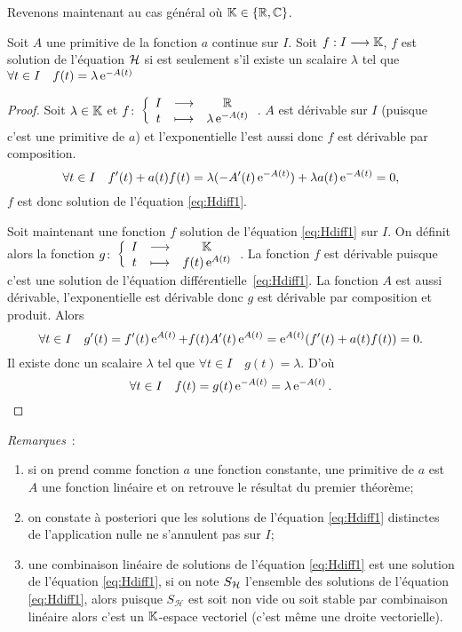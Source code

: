Revenons maintenant au cas général où \(\mathbb{K} \in \{\mathbb{R}, \mathbb{C}\}\).
%
\begin{theo}\label{theo:2}
Soit \(A\) une primitive de la fonction \(a\) continue sur \(I\). Soit \(f:I \longrightarrow \mathbb{K}\), \(f\) est solution de l'équation \(\mathcal{H}\) si est seulement s'il existe un scalaire \(\lambda\) tel que \(\forall t \in I \quad f(t)=\lambda \operatorname{e}^{-A(t)}\)
\end{theo}
\begin{proof}
Soit \(\lambda \in \mathbb{K}\) et \(f\colon \left\{\begin{array}{ccc} I & \longrightarrow &\mathbb{R}\\ t & \longmapsto & \lambda \operatorname{e}^{-A(t)} \end{array} \right.\). \(A\) est dérivable sur \(I\) (puisque c'est une primitive de \(a\)) et l'exponentielle l'est aussi donc \(f\) est dérivable par composition.
\begin{equation}
\forall t \in I \quad f'(t)+a(t)f(t)=\lambda(-A'(t)\operatorname{e}^{-A(t)}) + \lambda a(t)\operatorname{e}^{-A(t)}=0,
\end{equation}
\(f\) est donc solution de l'équation \eqref{eq:Hdiff1}.

Soit maintenant une fonction \(f\) solution de l'équation \eqref{eq:Hdiff1} sur \(I\). On définit alors la fonction \(g\colon \left\{\begin{array}{ccc} I & \longrightarrow &\mathbb{K}\\ t & \longmapsto & f(t)\operatorname{e}^{A(t)} \end{array} \right.\). La fonction \(f\) est dérivable puisque c'est une solution de l'équation différentielle~\eqref{eq:Hdiff1}. La fonction  \(A\) est aussi dérivable, l'exponentielle est dérivable donc \(g\) est dérivable par composition et produit. Alors
\begin{equation}
\forall t \in I \quad g'(t)=f'(t) \operatorname{e}^{A(t)} + f(t)A'(t)\operatorname{e}^{A(t)}=\operatorname{e}^{A(t)}(f'(t) + a(t)f(t)) =0.
\end{equation}
Il existe donc un scalaire \(\lambda\) tel que \(\forall t \in I \quad g(t)=\lambda\). D'où 
\begin{equation} 
\forall t \in I \quad f(t)=g(t) \operatorname{e}^{-A(t)}=\lambda \operatorname{e}^{-A(t)}.
\end{equation}
\end{proof}

\emph{Remarques}~:
\begin{enumerate}
\item si on prend comme fonction \(a\) une fonction constante, une primitive de \(a\) est \(A\) une fonction linéaire et on retrouve le résultat du premier théorème;
\item on constate à posteriori que les solutions de l'équation \eqref{eq:Hdiff1} distinctes de l'application nulle ne s'annulent pas sur \(I\);
\item une combinaison linéaire de solutions de l'équation \eqref{eq:Hdiff1} est une solution de l'équation \eqref{eq:Hdiff1}, si on note \(S_{\mathcal{H}} \) l'ensemble des solutions de l'équation \eqref{eq:Hdiff1}, alors puisque \(S_\mathcal{H} \) est soit non vide ou soit stable par combinaison linéaire alors c'est un \(\mathbb{K}\)-espace vectoriel (c'est même une droite vectorielle).
\end{enumerate}


